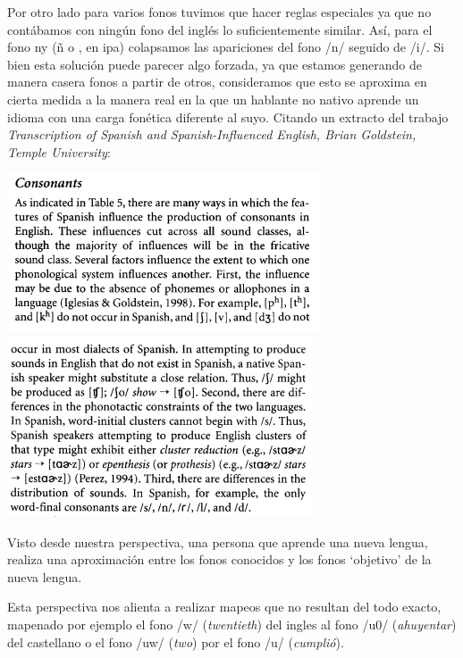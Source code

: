 
Por otro lado para varios fonos tuvimos que hacer reglas especiales ya que no contábamos con ningún fono del inglés lo suficientemente similar. Así,  para el fono ny (ñ o \textltailn, en ipa) colapsamos las apariciones del fono /n/ seguido de /i/. Si bien esta solución puede parecer algo forzada, ya que estamos generando de manera casera fonos a partir de otros, consideramos que esto se aproxima en cierta medida a la manera real en la que un hablante no nativo aprende un idioma con una carga fonética diferente al suyo. Citando un extracto del trabajo \textit{Transcription of Spanish and Spanish-Influenced English, Brian Goldstein, Temple University}\cite{spanishInfluencedEnglish}:

\begin{center}
\includegraphics[scale=0.6]{imagenes_investigacion/consonantes1.png}
\includegraphics[scale=0.6]{imagenes_investigacion/consonantes2.png}
\end{center}

Visto desde nuestra perspectiva, una persona que aprende una nueva lengua, realiza una aproximación entre los fonos conocidos y los fonos `objetivo' de la nueva lengua.

Esta perspectiva nos alienta a realizar mapeos que no resultan del todo exacto, mapenado por ejemplo el fono /w/ (\textit{twentieth}) del ingles al fono /u0/ (\textit{ahuyentar}) del castellano o el fono /uw/ (\textit{two}) por el fono /u/ (\textit{cumplió}).

